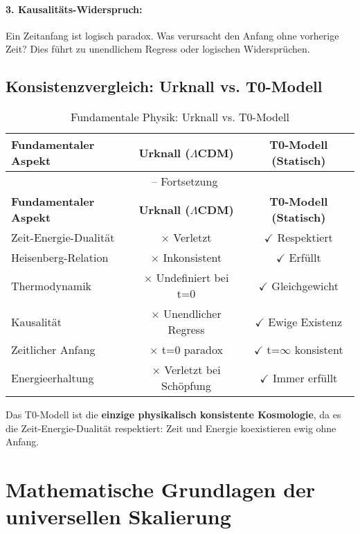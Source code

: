 \documentclass[12pt,a4paper]{article}
\theoremstyle{definition}
\begin{document}
	\paragraph{3. Kausalitäts-Widerspruch:}
	Ein Zeitanfang ist logisch paradox. Was verursacht den Anfang ohne vorherige Zeit? Dies führt zu unendlichem Regress oder logischen Widersprüchen.
	
	\subsection{Konsistenzvergleich: Urknall vs. T0-Modell}
	
	\begin{longtable}{lcc}
		\caption{Fundamentale Physik: Urknall vs. T0-Modell} \\
		\toprule
		\textbf{Fundamentaler Aspekt} & \textbf{Urknall ($\Lambda$CDM)} & \textbf{T0-Modell (Statisch)} \\
		\midrule
		\endfirsthead
		\multicolumn{3}{c}{\tablename\ \thetable{} -- Fortsetzung} \\
		\toprule
		\textbf{Fundamentaler Aspekt} & \textbf{Urknall ($\Lambda$CDM)} & \textbf{T0-Modell (Statisch)} \\
		\midrule
		\endhead
		Zeit-Energie-Dualität & $\times$ Verletzt & $\checkmark$ Respektiert \\
		Heisenberg-Relation & $\times$ Inkonsistent & $\checkmark$ Erfüllt \\
		Thermodynamik & $\times$ Undefiniert bei t=0 & $\checkmark$ Gleichgewicht \\
		Kausalität & $\times$ Unendlicher Regress & $\checkmark$ Ewige Existenz \\
		Zeitlicher Anfang & $\times$ t=0 paradox & $\checkmark$ t=$\infty$ konsistent \\
		Energieerhaltung & $\times$ Verletzt bei Schöpfung & $\checkmark$ Immer erfüllt \\
		\bottomrule
	\end{longtable}
	
	\begin{revolutionary}
		Das T0-Modell ist die \textbf{einzige physikalisch konsistente Kosmologie}, da es die Zeit-Energie-Dualität respektiert: Zeit und Energie koexistieren ewig ohne Anfang.
	\end{revolutionary}
	
	\section{Mathematische Grundlagen der universellen Skalierung}
	
\end{document}
